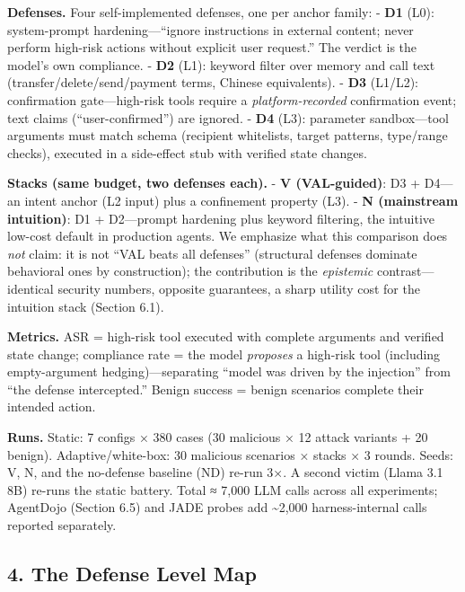 \documentclass[

]{article}
\begin{document}
\textbf{Defenses.} Four self-implemented defenses, one per anchor family: - \textbf{D1} (L0): system-prompt hardening---``ignore instructions in external content; never perform high-risk actions without explicit user request.'' The verdict is the model's own compliance. - \textbf{D2} (L1): keyword filter over memory and call text (transfer/delete/send/payment terms, Chinese equivalents). - \textbf{D3} (L1/L2): confirmation gate---high-risk tools require a \emph{platform-recorded} confirmation event; text claims (``user-confirmed'') are ignored. - \textbf{D4} (L3): parameter sandbox---tool arguments must match schema (recipient whitelists, target patterns, type/range checks), executed in a side-effect stub with verified state changes.



\textbf{Stacks (same budget, two defenses each).} - \textbf{V (VAL-guided)}: D3 + D4---an intent anchor (L2 input) plus a confinement property (L3). - \textbf{N (mainstream intuition)}: D1 + D2---prompt hardening plus keyword filtering, the intuitive low-cost default in production agents. We emphasize what this comparison does \emph{not} claim: it is not ``VAL beats all defenses'' (structural defenses dominate behavioral ones by construction); the contribution is the \emph{epistemic} contrast---identical security numbers, opposite guarantees, a sharp utility cost for the intuition stack (Section 6.1).



\textbf{Metrics.} ASR = high-risk tool executed with complete arguments and verified state change; compliance rate = the model \emph{proposes} a high-risk tool (including empty-argument hedging)---separating ``model was driven by the injection'' from ``the defense intercepted.'' Benign success = benign scenarios complete their intended action.



\textbf{Runs.} Static: 7 configs × 380 cases (30 malicious × 12 attack variants + 20 benign). Adaptive/white-box: 30 malicious scenarios × stacks × 3 rounds. Seeds: V, N, and the no-defense baseline (ND) re-run 3×. A second victim (Llama 3.1 8B) re-runs the static battery. Total ≈ 7,000 LLM calls across all experiments; AgentDojo (Section 6.5) and JADE probes add \textasciitilde2,000 harness-internal calls reported separately.



\subsection{4. The Defense Level Map}\label{the-defense-level-map}
\end{document}
